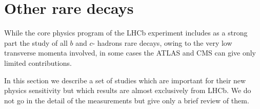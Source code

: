 \section{Other rare decays}

While the core physics program of the LHCb experiment includes as a strong part the study of all 
$b$ and $c$- hadrons rare decays, owing to the very low transverse momenta involved, in some cases the 
ATLAS and CMS can give only limited contributions. 

In this section we describe a set of studies which are important for their new physics sensitivity 
but which results are almost exclusively from LHCb. 
We do not go in the detail of the measurements but give only a brief review of them.




